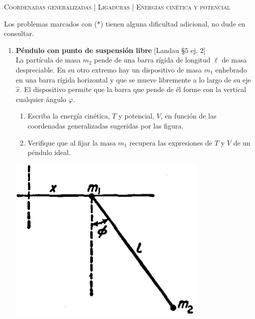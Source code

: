 \documentclass[11pt, a4paper, twoside]{article}
\begin{document}
\begin{center}
  \textsc{\large Coordenadas generalizadas | Ligaduras | Energías cinética y potencial}
\end{center}
\noindent
Los problemas marcados con (*) tienen alguna dificultad adicional, no dude en consultar.

\begin{enumerate}

\item
	\begin{minipage}[t][5cm]{0.7\textwidth}
		\textbf{Péndulo con punto de suspensión libre} [Landau \S5 ej. 2]\\
		La partícula de masa \(m_2\) pende de una barra rígida de longitud \(\ell\) de masa despreciable.
		En su otro extremo hay un dispositivo de masa \(m_1\) enhebrado en una barra rígida horizontal y que se mueve libremente a lo largo de su eje \(\hat{x}\).
		El dispositivo permite que la barra que pende de él forme con la vertical cualquier ángulo \(\varphi\). 
		\begin{enumerate}
			\item Escriba la energía cinética, \(T\) y potencial, \(V\), en función de las coordenadas generalizadas sugeridas por las figura.
			\item Verifique que al fijar la masa \(m_1\) recupera las expresiones de \(T\) y \(V\) de un péndulo ideal.
		\end{enumerate}
	\end{minipage}
	\begin{minipage}[c][1cm][t]{0.3\textwidth}
		\includegraphics[width=0.75\textwidth]{figures/landauS52_fig2.png}
	\end{minipage}




\end{enumerate}
\end{document}
